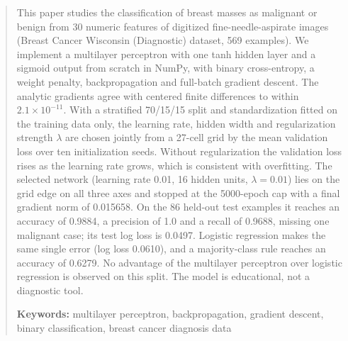 \documentclass[12pt,a4paper]{article}
\begin{document}
\setcounter{page}{1}

\begin{abstract}
\noindent This paper studies the classification of breast masses as malignant or benign from 30 numeric features of digitized fine-needle-aspirate images (Breast Cancer Wisconsin (Diagnostic) dataset, 569 examples). We implement a multilayer perceptron with one tanh hidden layer and a sigmoid output from scratch in NumPy, with binary cross-entropy, a weight penalty, backpropagation and full-batch gradient descent. The analytic gradients agree with centered finite differences to within $2.1\times10^{-11}$. With a stratified 70/15/15 split and standardization fitted on the training data only, the learning rate, hidden width and regularization strength $\lambda$ are chosen jointly from a 27-cell grid by the mean validation loss over ten initialization seeds. Without regularization the validation loss rises as the learning rate grows, which is consistent with overfitting. The selected network (learning rate 0.01, 16 hidden units, $\lambda=0.01$) lies on the grid edge on all three axes and stopped at the 5000-epoch cap with a final gradient norm of 0.015658. On the 86 held-out test examples it reaches an accuracy of 0.9884, a precision of 1.0 and a recall of 0.9688, missing one malignant case; its test log loss is 0.0497. Logistic regression makes the same single error (log loss 0.0610), and a majority-class rule reaches an accuracy of 0.6279. No advantage of the multilayer perceptron over logistic regression is observed on this split. The model is educational, not a diagnostic tool.

\noindent\textbf{Keywords:} multilayer perceptron, backpropagation, gradient descent, binary classification, breast cancer diagnosis data
\end{abstract}

\newpage
\tableofcontents
\newpage

\setcounter{page}{1}





\end{document}
